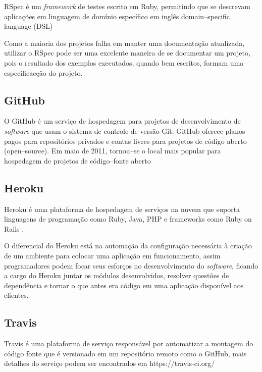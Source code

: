 RSpec \'e um \emph{framework} de testes escrito em Ruby, permitindo que se descrevam aplica\c{c}\~oes em linguagem de dom\'inio espec\'ifico em ingl\^es domain--specific language (DSL) \cite{chelimsky2010rspec}

Como a maioria dos projetos falha em manter uma documenta\c{c}\~ao atualizada, utilizar o RSpec pode ser uma excelente maneira de se documentar um projeto, pois o resultado dos exemplos executados, quando bem escritos, formam uma especificac\c{c}\~ao do projeto.

\subsection{GitHub}

O GitHub \'e um servi\c{c}o de hospedagem para projetos de desenvolvimento de \emph{software} que usam o sistema de controle de vers\~ao Git. GitHub oferece planos pagos para reposit\'orios privados e contas livres para projetos de c\'odigo aberto (open--source). Em maio de 2011, tornou--se o local mais popular para hospedagem de projetos de c\'odigo--fonte aberto \cite{loeliger2012version}

\subsection{Heroku}

Heroku \'e uma plataforma de hospedagem de servi\c{c}os na nuvem que suporta linguagens de programa\c{c}\~ao como Ruby, Java, PHP e frameworks como Ruby on Rails \cite{kemp2013professional}.

O diferencial do Heroku est\'a na automa\c{c}\~ao da configura\c{c}\~ao necess\'aria \`a cria\c{c}\~ao de um ambiente para colocar uma aplica\c{c}\~ao em funcionamento, assim programadores podem focar seus esfor\c{c}os no desenvolvimento do \emph{software}, ficando a cargo do Heroku juntar os m\'odulos desenvolvidos, resolver quest\~oes de depend\^encia e tornar o que antes era c\'odigo em uma aplica\c{c}\~ao dispon\'ivel aos clientes.

\subsection{Travis}

Travis \'e uma plataforma de servi\c{c}o respons\'avel por automatizar a montagem do c\'odigo fonte que \'e versionado em um reposit\'orio remoto como o GitHub, mais detalhes do servi\c{c}o podem ser encontrados em https://travis-ci.org/

